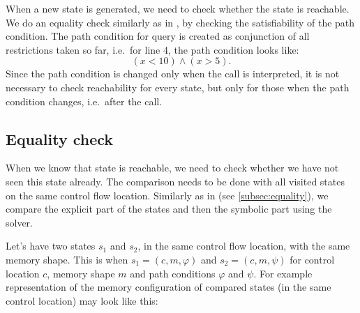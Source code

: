 When a new state is generated, we need to check whether the state is reachable.
We do an equality check similarly as in \SymDIVINE, by checking the satisfiability of the
path condition. The path condition for \SMT query is created as conjunction of
all restrictions taken so far, i.e.~for line 4, the path condition looks like:
\[ (x < 10) \wedge (x > 5).\]
Since the path condition is changed only when the  call is
interpreted, it is not necessary to check reachability for every state, but only
for those when the path condition changes, i.e.~after the  call.

\subsection{Equality check}

When we know that state is reachable, we need to check whether we have not seen
this state already. The comparison needs to be done with all visited states on
the same control flow location. Similarly as in \SymDIVINE (see
\autoref{subsec:equality}), we compare the explicit part of the
states and then the symbolic part using the \SMT solver.

Let's have two states $s_1$ and $s_2$, in the same control flow location, with
the same memory shape. This is when $s_1 = (c, m, \varphi)$ and $s_2 = (c,
m, \psi)$ for control location $c$, memory shape $m$ and path conditions $\varphi$ and $\psi$.
For example representation of the memory configuration of compared states (in
the same control location) may look like this:


